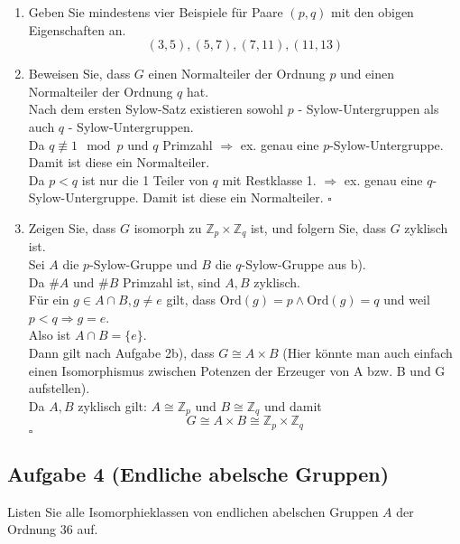 \documentclass[11pt,a4paper,ngerman]{article}
\newcommand{\Z}{\mathbb{Z}}
\newcommand{\ord}{\text{Ord}}
\begin{document}
\begin{enumerate}[\bfseries a)]
\item Geben Sie mindestens vier Beispiele für Paare $(p,q)$ mit den obigen Eigenschaften an. \\
$$ (3, 5), (5, 7), (7, 11), (11, 13) $$

\item Beweisen Sie, dass $G$ einen Normalteiler der Ordnung $p$ und einen Normalteiler der Ordnung $q$ hat. \\

Nach dem ersten Sylow-Satz existieren sowohl $p$ - Sylow-Untergruppen als auch $q$ - Sylow-Untergruppen.\\
Da $q \not\equiv 1 \mod p$ und $q$ Primzahl $\Rightarrow$ ex. genau eine $p$-Sylow-Untergruppe. Damit ist diese ein Normalteiler. \\
Da $p < q$ ist nur die 1 Teiler von $q$ mit Restklasse 1. $\Rightarrow$ ex. genau eine $q$-Sylow-Untergruppe. Damit ist diese ein Normalteiler.
\mbox{} \hfill $\square$

\item  Zeigen Sie, dass $G$ isomorph zu $\Z_p \times \Z_q$ ist, und folgern Sie, dass $G$ zyklisch ist. \\

Sei $A$ die $p$-Sylow-Gruppe und $B$ die $q$-Sylow-Gruppe aus b).\\
Da $\#A$ und $\#B$ Primzahl ist, sind $A, B$ zyklisch. \\
Für ein $g \in A \cap B, g \neq e$ gilt, dass $\ord(g) = p \land \ord(g) = q$ und weil $p < q \Rightarrow g = e$.\\

Also ist $ A \cap B = \{ e \}$.\\
 Dann gilt nach Aufgabe 2b), dass $G \cong A \times B$ (Hier könnte man auch einfach einen Isomorphismus zwischen Potenzen der Erzeuger von A bzw. B und G aufstellen).\\
Da $A,B$ zyklisch gilt: $A \cong \Z_p$ und $B \cong \Z_q$ und damit 
$$
G \cong A \times B \cong \Z_p \times \Z_q
$$
\mbox{} \hfill $\square$
\end{enumerate}


\subsection*{Aufgabe 4 \mdseries (Endliche abelsche Gruppen)}
Listen Sie alle Isomorphieklassen von endlichen abelschen Gruppen $A$ der Ordnung 36
auf. \\
\end{document}
